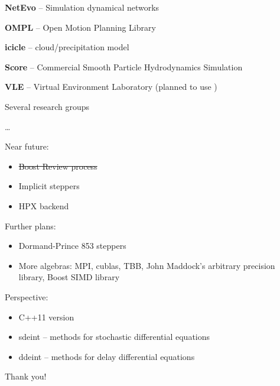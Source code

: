 \begin{frame}[fragile]
 

\vspace{2ex}


\textbf{NetEvo} -- Simulation dynamical networks

\vspace{2ex}
\textbf{OMPL} -- Open Motion Planning Library

\vspace{2ex}
\textbf{icicle} -- cloud/precipitation model

\vspace{2ex}
\textbf{Score} -- Commercial Smooth Particle Hydrodynamics Simulation

\vspace{2ex}
\textbf{VLE} -- Virtual Environment Laboratory (planned to use \odeint )

\vspace{2ex}
Several research groups

\vspace{2ex}
\dots


\end{frame}





\begin{frame}

 \vspace{2ex}

Near future:
\begin{itemize}
\item \sout{Boost Review process}
\item Implicit steppers
\item HPX backend
\end{itemize}

\vspace{2ex}
Further plans:
\begin{itemize}
 \item Dormand-Prince 853 steppers
 \item More algebras: MPI, cublas, TBB, John Maddock's arbitrary precision library, Boost SIMD library
\end{itemize}

\vspace{2ex}                                                                                                       
Perspective:
\begin{itemize}
 \item C++11 version
 \item sdeint -- methods for stochastic differential equations
 \item ddeint -- methods for delay differential equations
\end{itemize}


\end{frame}




\begin{frame}

\centerline{\Large Thank you!}

\end{frame}
